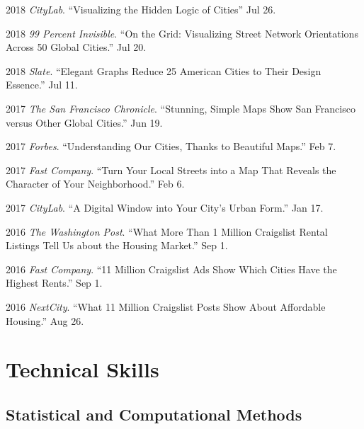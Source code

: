\documentclass[12pt,letterpaper]{report}
\begin{document}
	\begin{tablist}

		\item[2018] \tab \textit{CityLab}. \enquote{Visualizing the Hidden Logic of Cities} Jul 26.

		\item[2018] \tab \textit{99 Percent Invisible}. \enquote{On the Grid: Visualizing Street Network Orientations Across 50 Global Cities.} Jul 20.

		\item[2018] \tab \textit{Slate}. \enquote{Elegant Graphs Reduce 25 American Cities to Their Design Essence.} Jul 11.

		\item[2017] \tab \textit{The San Francisco Chronicle}. \enquote{Stunning, Simple Maps Show San Francisco versus Other Global Cities.} Jun 19.

		\item[2017] \tab \textit{Forbes}. \enquote{Understanding Our Cities, Thanks to Beautiful Maps.} Feb 7.

		\item[2017] \tab \textit{Fast Company}. \enquote{Turn Your Local Streets into a Map That Reveals the Character of Your Neighborhood.} Feb 6.

		\item[2017] \tab \textit{CityLab}. \enquote{A Digital Window into Your City's Urban Form.} Jan 17.

		\item[2016] \tab \textit{The Washington Post}. \enquote{What More Than 1 Million Craigslist Rental Listings Tell Us about the Housing Market.} Sep 1.

		\item[2016] \tab \textit{Fast Company}. \enquote{11 Million Craigslist Ads Show Which Cities Have the Highest Rents.} Sep 1.

		\item[2016] \tab \textit{NextCity}. \enquote{What 11 Million Craigslist Posts Show About Affordable Housing.} Aug 26.

	\end{tablist}



	\section*{Technical Skills}

	\subsection*{Statistical and Computational Methods}
\end{document}
